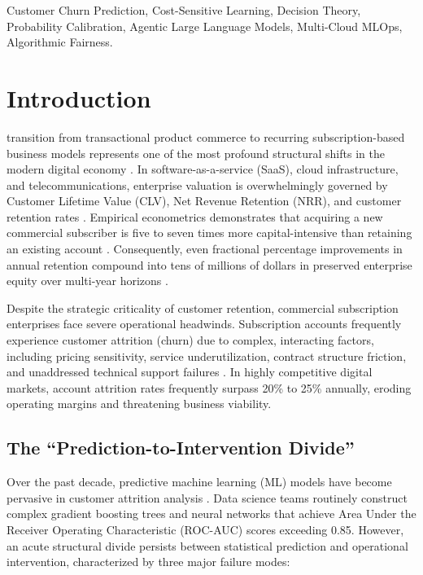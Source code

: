 \documentclass[journal,compsoc]{IEEEtran}
\begin{document}
\begin{IEEEkeywords}
Customer Churn Prediction, Cost-Sensitive Learning, Decision Theory, Probability Calibration, Agentic Large Language Models, Multi-Cloud MLOps, Algorithmic Fairness.
\end{IEEEkeywords}

\section{Introduction}

 transition from transactional product commerce to recurring subscription-based business models represents one of the most profound structural shifts in the modern digital economy \cite{chen2012business, davenport2014bigdata}. In software-as-a-service (SaaS), cloud infrastructure, and telecommunications, enterprise valuation is overwhelmingly governed by Customer Lifetime Value (CLV), Net Revenue Retention (NRR), and customer retention rates \cite{gupta2004valuing}. Empirical econometrics demonstrates that acquiring a new commercial subscriber is five to seven times more capital-intensive than retaining an existing account \cite{davenport2014bigdata, shmueli2020data}. Consequently, even fractional percentage improvements in annual retention compound into tens of millions of dollars in preserved enterprise equity over multi-year horizons \cite{gupta2004valuing, verbraeken2012novel}.

Despite the strategic criticality of customer retention, commercial subscription enterprises face severe operational headwinds. Subscription accounts frequently experience customer attrition (churn) due to complex, interacting factors, including pricing sensitivity, service underutilization, contract structure friction, and unaddressed technical support failures \cite{coussement2013churn, verbeke2011building}. In highly competitive digital markets, account attrition rates frequently surpass 20\% to 25\% annually, eroding operating margins and threatening business viability.

\subsection{The ``Prediction-to-Intervention Divide''}
Over the past decade, predictive machine learning (ML) models have become pervasive in customer attrition analysis \cite{ahmad2019, lemmens2006bagging, verbeke2011building}. Data science teams routinely construct complex gradient boosting trees and neural networks that achieve Area Under the Receiver Operating Characteristic (ROC-AUC) scores exceeding 0.85. However, an acute structural divide persists between statistical prediction and operational intervention, characterized by three major failure modes:
\end{document}
